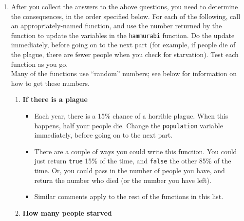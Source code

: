 \documentclass[12pt,a4paper,times]{article}
\begin{document}
\begin{enumerate}
  As an example, the first function has been written for you.
\begin{Verbatim}
  def askHowMuchLandToBuy(bushels: Int, price: Int) = {
    var acresToBuy = readInt("How many acres will you buy? ")
    while (acresToBuy < 0 || acresToBuy * price > bushels) {
      println("O Great Hammurabi, we have but " + bushels + " bushels of grain!")
      acresToBuy = readInt("How many acres will you buy? ")
    }
    acresToBuy
  }
\end{Verbatim}
And here is a sample call to the function (which you would put inside the \verb!hammurabi! function).
\begin{Verbatim}
var acresToBuy = askHowMuchLandToBuy(bushelsInStorage, pricePerAcre)
acresOwned = acresOwned + acresToBuy
\end{Verbatim}
  Each function should be given just enough information to test whether
  the user's answer is legal, and to return that legal answer. That
  answer should then be used (within the \texttt{hammurabi} function) to
  adjust the values of the variables declared in \ref{variables} above. Don't forget
  to test each function as you write it!
\item
  After you collect the answers to the above questions, you need to
  determine the consequences, in the order specified below. For each of
  the following, call an appropriately-named function, and use the
  number returned by the function to update the variables in the
  \texttt{hammurabi} function. Do the update immediately, before going
  on to the next part (for example, if people die of the plague, there
  are fewer people when you check for starvation). Test each function as
  you go.\\[2\baselineskip]Many of the functions use ``random'' numbers;
  see below for information on how to get these numbers.

  \begin{enumerate}
  \def\labelenumii{\alph{enumii}.}
  \item
    \textbf{If there is a plague}

    \begin{itemize}
    \item
      Each year, there is a 15\% chance of a horrible plague. When this
      happens, half your people die. Change the \texttt{population}
      variable immediately, before going on to the next part.
    \item
      There are a couple of ways you could write this function. You
      could just return \texttt{true} 15\% of the time, and
      \texttt{false} the other 85\% of the time. Or, you could pass in
      the number of people you have, and return the number who died (or
      the number you have left).
    \item
      Similar comments apply to the rest of the functions in this list.
    \end{itemize}
  \item
    \textbf{How many people starved}


\end{enumerate}
\end{enumerate}
\end{document}
